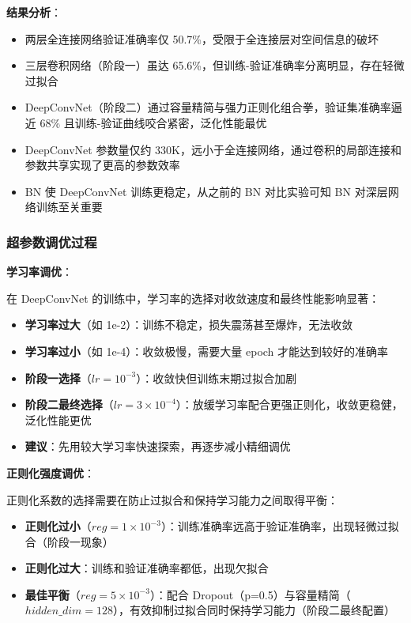 \documentclass[a4paper]{article}
\begin{document}
\textbf{结果分析}：
\begin{itemize}
    \item 两层全连接网络验证准确率仅 50.7\%，受限于全连接层对空间信息的破坏
    \item 三层卷积网络（阶段一）虽达 65.6\%，但训练-验证准确率分离明显，存在轻微过拟合
    \item DeepConvNet（阶段二）通过容量精简与强力正则化组合拳，验证集准确率逼近 68\% 且训练-验证曲线咬合紧密，泛化性能最优
    \item DeepConvNet 参数量仅约 330K，远小于全连接网络，通过卷积的局部连接和参数共享实现了更高的参数效率
    \item BN 使 DeepConvNet 训练更稳定，从之前的 BN 对比实验可知 BN 对深层网络训练至关重要
\end{itemize}

\subsubsection{超参数调优过程}

\textbf{学习率调优}：

在 DeepConvNet 的训练中，学习率的选择对收敛速度和最终性能影响显著：

\begin{itemize}
    \item \textbf{学习率过大}（如 1e-2）：训练不稳定，损失震荡甚至爆炸，无法收敛
    \item \textbf{学习率过小}（如 1e-4）：收敛极慢，需要大量 epoch 才能达到较好的准确率
    \item \textbf{阶段一选择}（$lr=10^{-3}$）：收敛快但训练末期过拟合加剧
    \item \textbf{阶段二最终选择}（$lr=3\times 10^{-4}$）：放缓学习率配合更强正则化，收敛更稳健，泛化性能更优
    \item \textbf{建议}：先用较大学习率快速探索，再逐步减小精细调优
\end{itemize}

\textbf{正则化强度调优}：

正则化系数的选择需要在防止过拟合和保持学习能力之间取得平衡：

\begin{itemize}
    \item \textbf{正则化过小}（$reg=1\times 10^{-3}$）：训练准确率远高于验证准确率，出现轻微过拟合（阶段一现象）
    \item \textbf{正则化过大}：训练和验证准确率都低，出现欠拟合
    \item \textbf{最佳平衡}（$reg=5\times 10^{-3}$）：配合 Dropout（p=0.5）与容量精简（$hidden\_dim=128$），有效抑制过拟合同时保持学习能力（阶段二最终配置）
\end{itemize}
\end{document}
